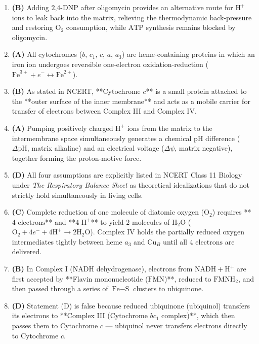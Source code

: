 \documentclass[11pt, a4paper]{article}
\begin{document}
\begin{enumerate}[label=\textbf{\arabic*.}]
\item \textbf{(B)} Adding $\text{2,4-DNP}$ after oligomycin provides an alternative route for $\text{H}^+$ ions to leak back into the matrix, relieving the thermodynamic back-pressure and restoring $\text{O}_2$ consumption, while $\text{ATP}$ synthesis remains blocked by oligomycin.

\item \textbf{(A)} All cytochromes ($b$, $c_1$, $c$, $a$, $a_3$) are heme-containing proteins in which an iron ion undergoes reversible one-electron oxidation-reduction ($\text{Fe}^{3+} + e^- \leftrightarrow \text{Fe}^{2+}$).

\item \textbf{(B)} As stated in NCERT, **Cytochrome $c$** is a small protein attached to the **outer surface of the inner membrane** and acts as a mobile carrier for transfer of electrons between Complex III and Complex IV.

\item \textbf{(A)} Pumping positively charged $\text{H}^+$ ions from the matrix to the intermembrane space simultaneously generates a chemical pH difference ($\Delta \text{pH}$, matrix alkaline) and an electrical voltage ($\Delta \psi$, matrix negative), together forming the proton-motive force.

\item \textbf{(D)} All four assumptions are explicitly listed in NCERT Class 11 Biology under \textit{The Respiratory Balance Sheet} as theoretical idealizations that do not strictly hold simultaneously in living cells.

\item \textbf{(C)} Complete reduction of one molecule of diatomic oxygen ($\text{O}_2$) requires **$4\text{ electrons}$** and **$4\text{ H}^+$** to yield $2\text{ molecules}$ of $\text{H}_2\text{O}$ ($\text{O}_2 + 4e^- + 4\text{H}^+ \rightarrow 2\text{H}_2\text{O}$). Complex IV holds the partially reduced oxygen intermediates tightly between heme $a_3$ and $\text{Cu}_B$ until all $4\text{ electrons}$ are delivered.

\item \textbf{(B)} In Complex I ($\text{NADH}$ dehydrogenase), electrons from $\text{NADH} + \text{H}^+$ are first accepted by **Flavin mononucleotide ($\text{FMN}$)**, reduced to $\text{FMNH}_2$, and then passed through a series of $\text{Fe}-\text{S}$ clusters to ubiquinone.

\item \textbf{(D)} Statement (D) is false because reduced ubiquinone (ubiquinol) transfers its electrons to **Complex III (Cytochrome $bc_1$ complex)**, which then passes them to Cytochrome $c$ — ubiquinol never transfers electrons directly to Cytochrome $c$.


\end{enumerate}
\end{document}
